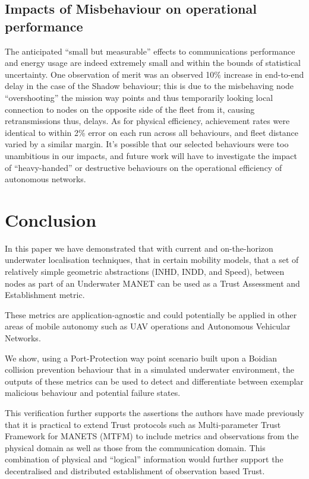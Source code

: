 \subsection{Impacts of Misbehaviour on operational performance}
The anticipated ``small but measurable'' effects to communications performance and energy usage are indeed extremely small and within the bounds of statistical uncertainty.
One observation of merit was an observed 10\% increase in end-to-end delay in the case of the Shadow behaviour; this is due to the misbehaving node ``overshooting'' the mission way points and thus temporarily looking local connection to nodes on the opposite side of the fleet from it, causing retransmissions thus, delays.
As for physical efficiency, achievement rates were identical to within 2\% error on each run across all behaviours, and fleet distance varied by a similar margin.
It's possible that our selected behaviours were too unambitious in our impacts, and future work will have to investigate the impact of ``heavy-handed'' or destructive behaviours on the operational efficiency of autonomous networks.

\section{Conclusion}
In this paper we have demonstrated that with current and on-the-horizon underwater localisation techniques, that in certain mobility models, that a set of relatively simple geometric abstractions (INHD, INDD, and Speed), between nodes as part of an Underwater MANET can be used as a Trust Assessment and Establishment metric.

These metrics are application-agnostic and could potentially be applied in other areas of mobile autonomy such as UAV operations and Autonomous Vehicular Networks.

We show, using a Port-Protection way point scenario built upon a Boidian collision prevention behaviour that in a simulated underwater environment, the outputs of these metrics can be used to detect and differentiate between exemplar malicious behaviour and potential failure states.

This verification further supports the assertions the authors have made previously that it is practical to extend Trust protocols such as Multi-parameter Trust Framework for MANETS (MTFM)\cite{Guo2012} to include metrics and observations from the physical domain as well as those from the communication domain\cite{Bolster2014}.
This combination of physical and ``logical'' information would further support the decentralised and distributed establishment of observation based Trust.


